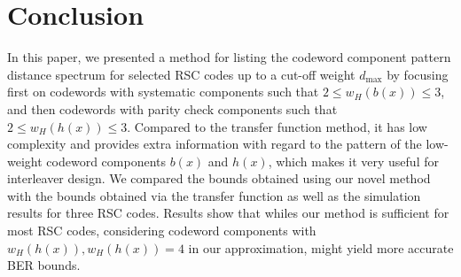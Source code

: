 \section{Conclusion}
\label{sec6}
 



In this paper, we presented a method for listing the codeword component pattern distance spectrum for selected RSC codes up to a cut-off weight $d_{\text{max}}$ by focusing first on codewords with systematic components such that $2 \leq w_H(b(x)) \leq 3$, and then codewords with parity check components such that $2 \leq w_H(h(x)) \leq 3$. Compared to the transfer function method, it has low complexity and provides extra information with regard to the pattern of the low-weight codeword components $b(x)$ and $h(x)$, which makes it very useful for interleaver design. We compared the bounds obtained using our novel method with the bounds obtained via the transfer function as well as the simulation results for three RSC codes. Results show that whiles our method is sufficient for most RSC codes, considering codeword components with $w_H(h(x)), w_H(h(x)) =4$ in our approximation, might yield more accurate BER bounds.
